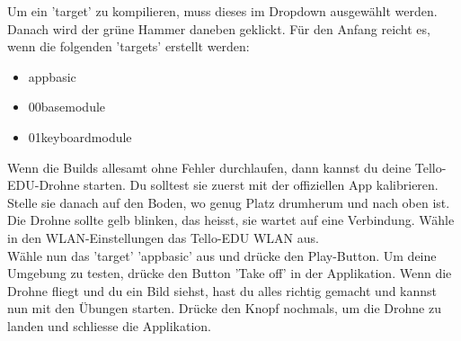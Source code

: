 Um ein 'target' zu kompilieren, muss dieses im Dropdown ausgewählt werden. Danach wird der grüne Hammer daneben
geklickt. Für den Anfang reicht es, wenn die folgenden 'targets' erstellt werden:
\begin{itemize}
    \item app\textunderscore basic
    \item 00\textunderscore base\textunderscore module
    \item 01\textunderscore keyboard\textunderscore module
\end{itemize}
Wenn die Builds allesamt ohne Fehler durchlaufen, dann kannst du deine Tello-EDU-Drohne starten.
Du solltest sie zuerst mit der offiziellen App kalibrieren.
Stelle sie danach auf den Boden, wo genug Platz drumherum und nach oben ist. Die Drohne sollte gelb blinken, das heisst,
sie wartet auf eine Verbindung. Wähle in den WLAN-Einstellungen das Tello-EDU WLAN aus.\\
Wähle nun das 'target' 'app\textunderscore basic' aus und drücke den Play-Button. Um deine Umgebung zu testen, drücke
den Button 'Take off' in der Applikation. Wenn die Drohne fliegt und du ein Bild siehst, hast du alles richtig gemacht
und kannst nun mit den Übungen starten. Drücke den Knopf nochmals, um die Drohne zu landen und schliesse die Applikation.